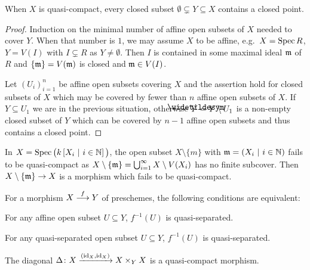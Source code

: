 \documentclass[a4paper,parskip=half,numbers=enddot, DIV=12]{scrreprt}
\begin{document}
\begin{prop}
    When $X$ is quasi-compact, every closed subset $\emptyset\subsetneq Y\subseteq X$ contains a closed point.
\end{prop}
\begin{proof}
    Induction on the minimal number of affine open subsets of $X$ needed to cover $Y$. When that number is $1$, we may assume $X$ to be affine, e.g.\ $X= \operatorname{Spec} R$, $Y=V(I)$ with $I\subsetneq R$ as $Y\neq\emptyset$. Then $I$ is contained in some maximal ideal $\mathfrak{m}$ of $R$ and $\{\mathfrak{m}\} = V(\mathfrak{m})$ is closed and $\mathfrak{m}\in V(I)$.
    
    Let $(U_i)_{i=1}^n$ be affine open subsets covering $X$ and the assertion hold for closed subsets of $X$ which may be covered by fewer than $n$ affine open subsets of $X$. If $Y\subseteq U_1$ we are in the previous situation, otherwise $\snake Y = Y\setminus U_1$ is a non-empty closed subset of $Y$ which can be covered by $n-1$ affine open subsets and thus contains a closed point.
\end{proof}
\begin{example}
    In $X=\operatorname{Spec} \big(k\left[X_i \ \middle|\  i\in \mathbb{N}\right]\big)$, the open subset $X\setminus \{m\}$ with $\mathfrak{m}= \left( X_i\ \middle|\  i\in\mathbb{N} \right)$ fails to be quasi-compact as $X\setminus \{\mathfrak{m}\} = \bigcup_{i=1}^\infty X\setminus V(X_i)$ has no finite subcover. Then $X\setminus \{\mm\}\morphism X$ is a morphism which fails to be quasi-compact.
\end{example}
\begin{lem}
    For a morphism $X\morphism[f] Y$ of preschemes, the following conditions are equivalent:
    \begin{alphanumerate}
    \item 
        For any affine open subset $U\subseteq Y$, $f^{-1}(U)$ is quasi-separated.
    \item 
        For any quasi-separated open subset $U\subseteq Y$, $f^{-1}(U)$ is quasi-separated.
    \item 
        The diagonal $\Delta\colon X \xrightarrow{(\operatorname{id}_X,\operatorname{id}_X)} X\times_Y X$ is a quasi-compact morphism.
    \end{alphanumerate}
\end{lem}
\end{document}
